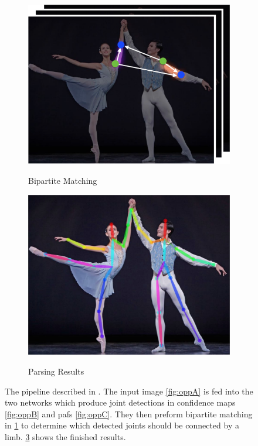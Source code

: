 \begin{figure}
  \begin{subfigure}[b]{0.25\textwidth}
    \includegraphics[width=0.9\linewidth]{img/openpose_pipeline_d}
    \label{fig:oppD}
    \caption{Bipartite Matching}
  \end{subfigure}
  
  \begin{subfigure}[b]{0.25\textwidth}
    \includegraphics[width=0.9\linewidth]{img/openpose_pipeline_e}
    \label{fig:oppE}
    \caption{Parsing Results}
  \end{subfigure}
  \caption{The pipeline described in \cite{cao2017realtime}. The input image \ref{fig:oppA} is fed into the two networks which produce joint detections in confidence maps \ref{fig:oppB} and \gls{paf}s \ref{fig:oppC}. They then preform bipartite matching in \ref{fig:oppD} to determine which detected joints should be connected by a limb. \ref{fig:oppE} shows the finished results.}
\end{figure}

